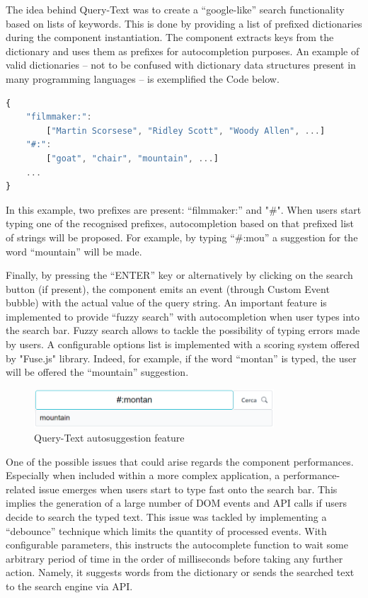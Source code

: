The idea behind Query-Text was to create a “google-like” search functionality based on lists of keywords. This is done by providing a list of prefixed dictionaries during the component instantiation. The component extracts keys from the dictionary and uses them as prefixes for autocompletion purposes. An example of valid dictionaries – not to be confused with dictionary data structures present in many programming languages – is exemplified the Code below.
\\
\begin{lstlisting}[caption={Dictionaries examples},label={dicts}, language=JavaScript, numbers=none]
{
    "filmmaker:":
        ["Martin Scorsese", "Ridley Scott", "Woody Allen", ...]
    "#:":
        ["goat", "chair", "mountain", ...]
    ...
}
\end{lstlisting}

In this example, two prefixes are present: “filmmaker:” and "\#". When users start typing one of the recognised prefixes, autocompletion based on that prefixed list of strings will be proposed. For example, by typing “\#:mou” a suggestion for the word “mountain” will be made.

Finally, by pressing the “ENTER” key or alternatively by clicking on the search button (if present), the component emits an event (through Custom Event bubble) with the actual value of the query string. An important feature is implemented to provide “fuzzy search” with autocompletion when user types into the search bar. Fuzzy search allows to tackle the possibility of typing errors made by users. A configurable options list is implemented with a scoring system offered by "Fuse.js" library. Indeed, for example, if the word “montan” is typed, the user will be offered the “mountain” suggestion.

\begin{figure}[H]
\centering
\includegraphics[width=0.8\textwidth]{images/autosuggest.png}
\caption{Query-Text autosuggestion feature}
\label{fig:queryTextAutosuggest}
\end{figure}

One of the possible issues that could arise regards the component performances. Especially when included within a more complex application, a performance-related issue emerges when users start to type fast onto the search bar. This implies the generation of a large number of DOM events and API calls if users decide to search the typed text. This issue was tackled by implementing a “debounce” technique which limits the quantity of processed events. With configurable parameters, this instructs the autocomplete function to wait some arbitrary period of time in the order of milliseconds before taking any further action. Namely, it suggests words from the dictionary or sends the searched text to the search engine via API.

